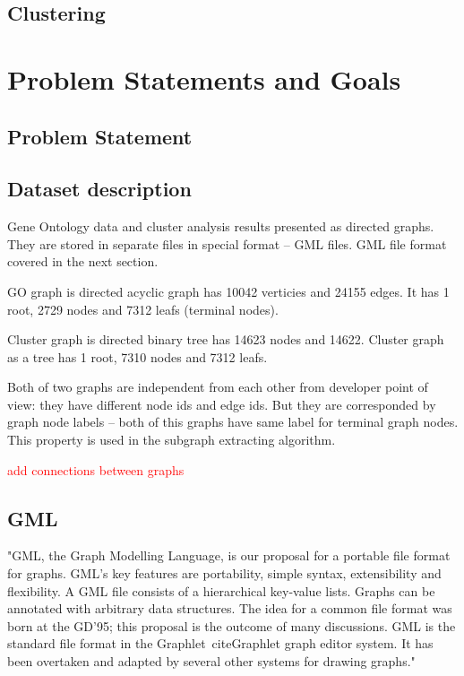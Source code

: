 \documentclass[a4paper,oneside]{article}
\newcommand*{\todo}[1]{
	\begin{LARGE}
		\textcolor{red}{#1}
	\end{LARGE}
}
\begin{document}
\subsection{Clustering}

\section{Problem Statements and Goals}

\subsection{Problem Statement}

\subsection{Dataset description}
Gene Ontology data and cluster analysis results presented as directed graphs. They are stored in separate files in special format -- GML files. GML file format covered in the next section.


GO graph is directed acyclic graph has 10042 verticies and  24155 edges. It has 1 root, 2729 nodes and 7312 leafs (terminal nodes).


Cluster graph is directed binary  tree has 14623 nodes and 14622. Cluster graph as a tree has 1 root, 7310 nodes and 7312 leafs.


Both of two graphs are independent from each other from developer point of view: they have different node ids and edge ids. But they are corresponded by graph node labels -- both of this graphs have same label for terminal graph nodes. This property is used in the subgraph extracting algorithm. 

\todo{add connections between graphs}

\subsection{GML}
 "GML, the Graph Modelling Language, is our proposal for a portable file format for graphs. GML's key features are portability, simple syntax, extensibility and flexibility. A GML file consists of a hierarchical key-value lists. Graphs can be annotated with arbitrary data structures. The idea for a common file format was born at the GD'95; this proposal is the outcome of many discussions. GML is the standard file format in the Graphlet~cite{Graphlet} graph editor system. It has been overtaken and adapted by several other systems for drawing graphs."~\cite{GML}
 
\end{document}
